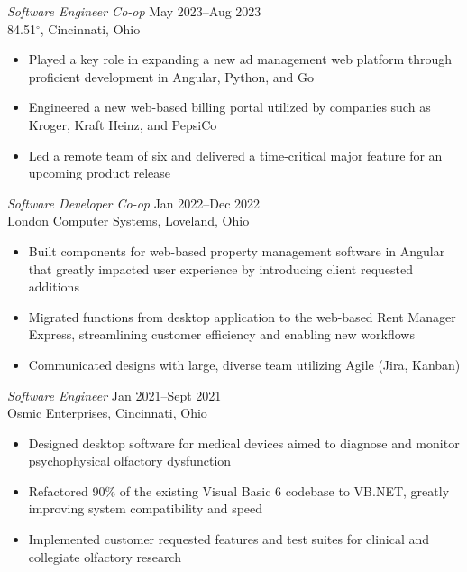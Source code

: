 \documentclass[margin]{res} %
\begin{document}
\begin{resume}
{\sl Software Engineer Co-op} \hfill {\color{black} May 2023–Aug 2023}  \\
84.51$^{\circ}$, Cincinnati, Ohio 
\vspace{1mm}
\begin{itemize}  %
\item Played a key role in expanding a new ad management web platform through proficient development in Angular, Python, and Go
\item Engineered a new web-based billing portal utilized by companies such as Kroger, Kraft Heinz, and PepsiCo
\item Led a remote team of six and delivered a time-critical major feature for an upcoming product release
\end{itemize}


{\sl Software Developer Co-op} \hfill {\color{black} Jan 2022–Dec 2022}  \\
London Computer Systems, Loveland, Ohio 
\vspace{1mm}
\begin{itemize}  %
\item Built components for web-based property management software in Angular that greatly impacted user experience by introducing client requested additions
\item Migrated functions from desktop application to the web-based Rent Manager Express, streamlining customer efficiency and enabling new workflows
\item Communicated designs with large, diverse team utilizing Agile (Jira, Kanban)
\end{itemize}


{\sl Software Engineer} \hfill {\color{black} Jan 2021–Sept 2021}  \\
Osmic Enterprises, Cincinnati, Ohio
\vspace{1mm}
\begin{itemize} %
\item Designed desktop software for medical devices aimed to diagnose and monitor psychophysical olfactory dysfunction
\item Refactored 90\% of the existing Visual Basic 6 codebase to VB.NET, greatly improving system compatibility and speed   
\item Implemented customer requested features and test suites for clinical and collegiate olfactory research
\end{itemize}


\end{resume}
\end{document}
